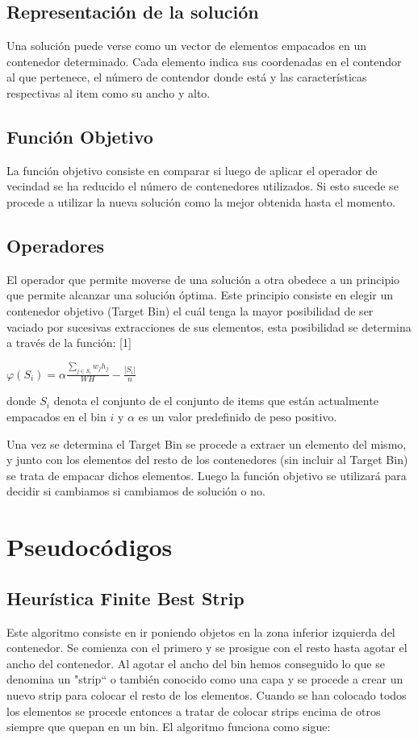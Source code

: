 \documentclass[a4paper,10pt]{article}
\begin{document}
\subsection{Representación de la solución}

Una solución puede verse como un vector de elementos empacados en un contenedor determinado. Cada elemento indica 
sus coordenadas en el contendor al que pertenece, el número de contendor donde está y las características respectivas al 
item como su ancho y alto. 

\subsection{Función Objetivo}
La función objetivo consiste en comparar si luego de aplicar el operador de vecindad se ha reducido el número de contenedores 
utilizados. Si esto sucede se procede a utilizar la nueva solución como la mejor obtenida hasta el momento.

\subsection{Operadores}
El operador que permite moverse de una solución a otra obedece a un principio que permite alcanzar una solución óptima. Este principio 
consiste en elegir un contenedor objetivo (Target Bin) el cuál tenga la mayor posibilidad de ser vaciado por sucesivas extracciones de 
sus elementos, esta posibilidad se determina a través de la función: [1]

\begin{center}
$\varphi(S_i) = \alpha \frac{\sum_{j \in S_i} {w_j h_j}}{W H} - \frac{|S_i|}{n}$
\end{center}

donde $S_i$ denota el conjunto de el conjunto de items que están actualmente empacados en el bin $i$ y $\alpha$ es un valor 
predefinido de peso positivo.

Una vez se determina el Target Bin se procede a extraer un elemento del mismo, y junto con los elementos del resto de los contenedores 
(sin incluir al Target Bin) se trata de empacar dichos elementos. Luego la función objetivo se utilizará para decidir si cambiamos 
si cambiamos de solución o no.

\section{Pseudocódigos}

\subsection{Heurística Finite Best Strip}

Este algoritmo consiste en ir poniendo objetos en la zona inferior izquierda del contenedor. Se comienza con el primero y se prosigue con 
el resto hasta agotar el ancho del contenedor. Al agotar el ancho del bin hemos conseguido lo que se denomina un "strip`` o también conocido 
como una capa y se procede a crear un nuevo strip para colocar el resto de los elementos. Cuando se han colocado todos los elementos 
se procede entonces a tratar de colocar strips encima de otros siempre que quepan en un bin. El algoritmo funciona como sigue:
\end{document}
